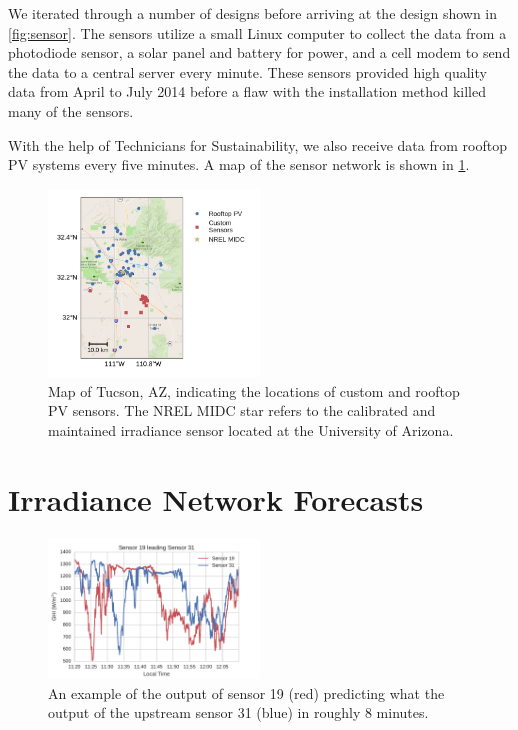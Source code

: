\documentclass[12pt,letterpaper,notitlepage,openany]{article}
\begin{document}
We iterated through a number of designs before arriving at the design
shown in \cref{fig:sensor}.
The sensors utilize a small Linux computer to collect the data from a
photodiode sensor, a solar panel and battery for power, and a cell
modem to send the data to a central server every minute.
These sensors provided high quality data from April to July 2014
before a flaw with the installation method killed many of the sensors.

With the help of Technicians for Sustainability, we also receive data
from rooftop PV systems every five minutes.
A map of the sensor network is shown in \cref{fig:networkmap}.

\begin{figure}[h]
\centering
\includegraphics[width=0.5\textwidth]{../dissertation/figs/map.pdf}
\caption[Map of sensor locations]{Map of Tucson, AZ, indicating the
  locations of custom and rooftop PV sensors. The NREL MIDC star
  refers to the calibrated and maintained irradiance sensor located at
  the University of Arizona.}
\label{fig:networkmap}
\end{figure}


\section{Irradiance Network Forecasts}
\begin{figure}[h]
\centering
\includegraphics[width=0.5\textwidth]{../dissertation/figs/leading_sens.pdf}
\caption{An example of the output of sensor 19 (red) predicting what
  the output of the upstream sensor 31 (blue) in roughly 8
  minutes.}
\label{fig:leading}
\end{figure}
\end{document}
